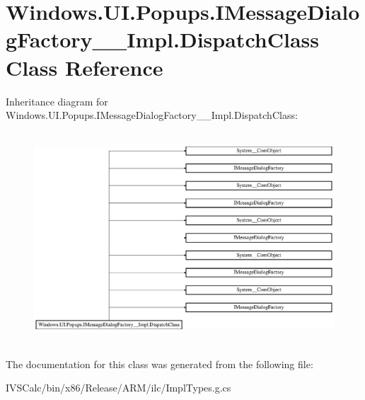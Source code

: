 \hypertarget{class_windows_1_1_u_i_1_1_popups_1_1_i_message_dialog_factory_____impl_1_1_dispatch_class}{}\section{Windows.\+U\+I.\+Popups.\+I\+Message\+Dialog\+Factory\+\_\+\+\_\+\+Impl.\+Dispatch\+Class Class Reference}
\label{class_windows_1_1_u_i_1_1_popups_1_1_i_message_dialog_factory_____impl_1_1_dispatch_class}
Inheritance diagram for Windows.\+U\+I.\+Popups.\+I\+Message\+Dialog\+Factory\+\_\+\+\_\+\+Impl.\+Dispatch\+Class\+:\begin{figure}[H]
\begin{center}
\leavevmode
\includegraphics[height=7.917737cm]{class_windows_1_1_u_i_1_1_popups_1_1_i_message_dialog_factory_____impl_1_1_dispatch_class}
\end{center}
\end{figure}


The documentation for this class was generated from the following file\+:\begin{DoxyCompactItemize}
\item 
I\+V\+S\+Calc/bin/x86/\+Release/\+A\+R\+M/ilc/Impl\+Types.\+g.\+cs\end{DoxyCompactItemize}
